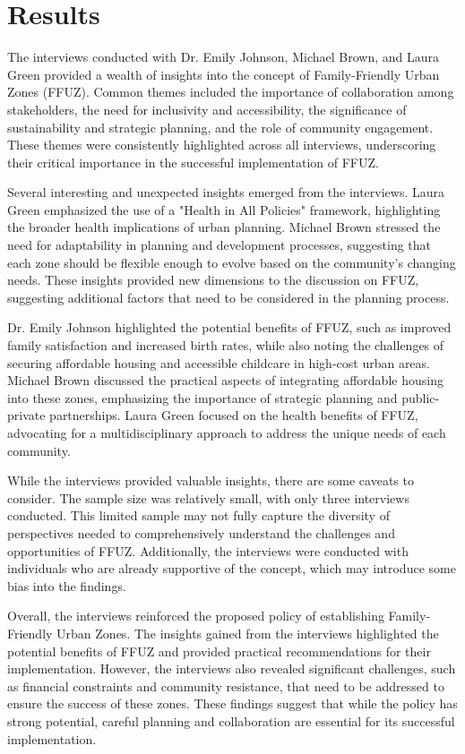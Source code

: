 \documentclass{article} %
\begin{document}
\section{Results}
\label{sec:results}

The interviews conducted with Dr. Emily Johnson, Michael Brown, and Laura Green provided a wealth of insights into the concept of Family-Friendly Urban Zones (FFUZ). Common themes included the importance of collaboration among stakeholders, the need for inclusivity and accessibility, the significance of sustainability and strategic planning, and the role of community engagement. These themes were consistently highlighted across all interviews, underscoring their critical importance in the successful implementation of FFUZ.

Several interesting and unexpected insights emerged from the interviews. Laura Green emphasized the use of a "Health in All Policies" framework, highlighting the broader health implications of urban planning. Michael Brown stressed the need for adaptability in planning and development processes, suggesting that each zone should be flexible enough to evolve based on the community's changing needs. These insights provided new dimensions to the discussion on FFUZ, suggesting additional factors that need to be considered in the planning process.

Dr. Emily Johnson highlighted the potential benefits of FFUZ, such as improved family satisfaction and increased birth rates, while also noting the challenges of securing affordable housing and accessible childcare in high-cost urban areas. Michael Brown discussed the practical aspects of integrating affordable housing into these zones, emphasizing the importance of strategic planning and public-private partnerships. Laura Green focused on the health benefits of FFUZ, advocating for a multidisciplinary approach to address the unique needs of each community.

While the interviews provided valuable insights, there are some caveats to consider. The sample size was relatively small, with only three interviews conducted. This limited sample may not fully capture the diversity of perspectives needed to comprehensively understand the challenges and opportunities of FFUZ. Additionally, the interviews were conducted with individuals who are already supportive of the concept, which may introduce some bias into the findings.

Overall, the interviews reinforced the proposed policy of establishing Family-Friendly Urban Zones. The insights gained from the interviews highlighted the potential benefits of FFUZ and provided practical recommendations for their implementation. However, the interviews also revealed significant challenges, such as financial constraints and community resistance, that need to be addressed to ensure the success of these zones. These findings suggest that while the policy has strong potential, careful planning and collaboration are essential for its successful implementation.
\end{document}
